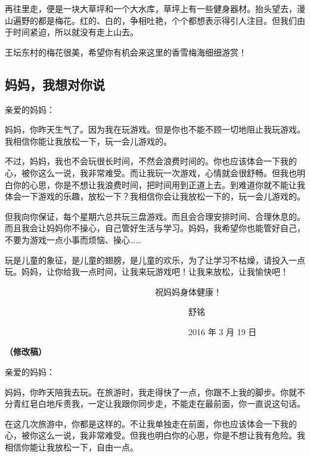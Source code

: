 \documentclass[UTF8,a4paper,titlepage,twoside,10.5pt]{article}
\begin{document}
再往里走，便是一块大草坪和一个大水库，草坪上有一些健身器材。抬头望去，漫山遍野的都是梅花。红的、白的，争相吐艳，个个都想表示得引人注目。但我们由于时间紧迫，所以就没有走上山去。

王坛东村的梅花很美，希望你有机会来这里的香雪梅海细细游赏！

\subsection{妈妈，我想对你说}
\label{sec:org5b4f3f4}

\noindent
亲爱的妈妈：

妈妈，你昨天生气了。因为我在玩游戏。但是你也不能不顾一切地阻止我玩游戏。我相信你能让我放松一下，玩一会儿游戏的。

不过，妈妈，我也不会玩很长时间，不然会浪费时间的。你也应该体会一下我的心，被你这么一说，我非常难受。而让我玩一次游戏，心情就会很舒畅。但我也明白你的心思，你是不想让我浪费时间，把时间用到正道上去。到难道你就不能让我体会一下游戏的乐趣，放松一下？我相信你会让我放松一下的，玩一会儿游戏的。

但我向你保证，每个星期六总共玩三盘游戏。而且会合理安排时间、合理休息的。而且我会让妈妈你不操心，自己管好生活与学习。妈妈，我希望你也能管好自己，不要为游戏一点小事而烦恼、操心……

玩是儿童的象征，是儿童的翅膀，是儿童的欢乐，为了让学习不枯燥，请投入一点玩。妈妈，让你给我一点时间，让我来玩游戏吧！让我来放松，让我愉快吧！

　　　　　　　　　　　　　　　　　　祝妈妈身体健康！

　　　　　　　　　　　　　　　　　　　　　　舒铭

　　　　　　　　　　　　　　　　　　　　　　2016 年 3 月 19 日

\vspace*{\baselineskip}

\noindent
\textbf{（修改稿）}

\noindent
亲爱的妈妈：


妈妈，你昨天陪我去玩。在旅游时，我走得快了一点，你跟不上我的脚步。你就不分青红皂白地斥责我，一定让我跟你同步走，不能走在最前面，你一直说这句话。

在这几次旅游中，你都是这样的。不让我单独走在前面，你也应该体会一下我的心，被你这么一说，我非常难受。但我也明白你的心思，你是不想让我有危险。我相信你能让我放松一下，自由一点。
\end{document}
